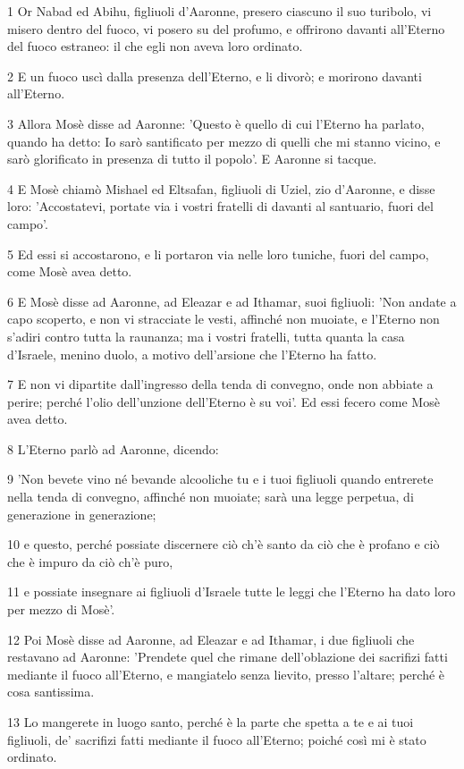 \par 1 Or Nabad ed Abihu, figliuoli d'Aaronne, presero ciascuno il suo turibolo, vi misero dentro del fuoco, vi posero su del profumo, e offrirono davanti all'Eterno del fuoco estraneo: il che egli non aveva loro ordinato.
\par 2 E un fuoco uscì dalla presenza dell'Eterno, e li divorò; e morirono davanti all'Eterno.
\par 3 Allora Mosè disse ad Aaronne: 'Questo è quello di cui l'Eterno ha parlato, quando ha detto: Io sarò santificato per mezzo di quelli che mi stanno vicino, e sarò glorificato in presenza di tutto il popolo'. E Aaronne si tacque.
\par 4 E Mosè chiamò Mishael ed Eltsafan, figliuoli di Uziel, zio d'Aaronne, e disse loro: 'Accostatevi, portate via i vostri fratelli di davanti al santuario, fuori del campo'.
\par 5 Ed essi si accostarono, e li portaron via nelle loro tuniche, fuori del campo, come Mosè avea detto.
\par 6 E Mosè disse ad Aaronne, ad Eleazar e ad Ithamar, suoi figliuoli: 'Non andate a capo scoperto, e non vi stracciate le vesti, affinché non muoiate, e l'Eterno non s'adiri contro tutta la raunanza; ma i vostri fratelli, tutta quanta la casa d'Israele, menino duolo, a motivo dell'arsione che l'Eterno ha fatto.
\par 7 E non vi dipartite dall'ingresso della tenda di convegno, onde non abbiate a perire; perché l'olio dell'unzione dell'Eterno è su voi'. Ed essi fecero come Mosè avea detto.
\par 8 L'Eterno parlò ad Aaronne, dicendo:
\par 9 'Non bevete vino né bevande alcooliche tu e i tuoi figliuoli quando entrerete nella tenda di convegno, affinché non muoiate; sarà una legge perpetua, di generazione in generazione;
\par 10 e questo, perché possiate discernere ciò ch'è santo da ciò che è profano e ciò che è impuro da ciò ch'è puro,
\par 11 e possiate insegnare ai figliuoli d'Israele tutte le leggi che l'Eterno ha dato loro per mezzo di Mosè'.
\par 12 Poi Mosè disse ad Aaronne, ad Eleazar e ad Ithamar, i due figliuoli che restavano ad Aaronne: 'Prendete quel che rimane dell'oblazione dei sacrifizi fatti mediante il fuoco all'Eterno, e mangiatelo senza lievito, presso l'altare; perché è cosa santissima.
\par 13 Lo mangerete in luogo santo, perché è la parte che spetta a te e ai tuoi figliuoli, de' sacrifizi fatti mediante il fuoco all'Eterno; poiché così mi è stato ordinato.
